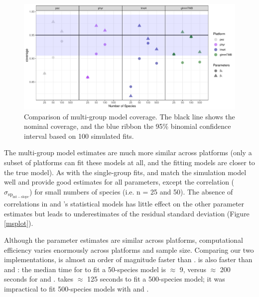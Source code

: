 \documentclass[12pt]{article}
\begin{document}
\begin{center}
\begin{figure}[H]
  \includegraphics[scale=0.7]{./figure/mscoverage.pdf}
  \caption{Comparison of multi-group model coverage. The black line shows the nominal coverage, and the blue ribbon the 95\% binomial confidence interval based on 100 simulated fits.}
  \label{msplot_coverage}
\end{figure}
\end{center}

The multi-group model estimates are much more similar across platforms (only a subset of platforms can fit these models at all, and the fitting models are closer to the true model).
As with the single-group fits,  and  match the simulation model well and provide good estimates for all parameters, except the correlation ($\sigma_{\mathrm{sp_{int-slope}}}$) for small numbers of species (i.e. n = 25 and 50).
The absence of correlations in  and 's statistical models has little effect on the other parameter estimates but leads to underestimates of the residual standard deviation (Figure \ref{msplot}).

Although the parameter estimates are similar across platforms, computational efficiency varies enormously across platforms and sample size.
Comparing our two implementations,  is almost an order of magnitude faster than .
 is also faster than  and : the median time for  to fit a 50-species model is $\approx$ 9, versus $\approx$ 200 seconds for  and .
 takes $\approx$ 125 seconds to fit a 500-species model; it was impractical to fit 500-species models with  and .

\end{document}
